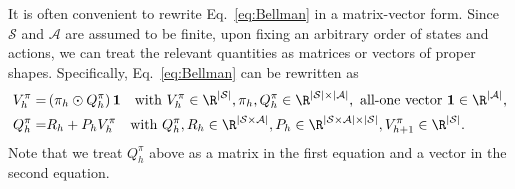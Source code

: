 It is often convenient to rewrite Eq.~\eqref{eq:Bellman} in a matrix-vector form.
Since $\mathcal{S}$ and $\mathcal{A}$ are assumed to be finite, upon fixing an arbitrary order of states and actions, we can treat the relevant quantities as matrices or vectors of proper shapes.
Specifically, Eq.~\eqref{eq:Bellman} can be rewritten as
\begin{align*}
    V_h^\pi =&\left(\pi_h \odot Q_h^\pi\right)\mathbf{1}
    \quad \text{with }V_h^\pi\in\R^{|\mathcal{S}|}, \pi_h ,Q_h^\pi \in \R^{|\mathcal{S}| \times |\mathcal{A}|}, \text{ all-one vector } \mathbf{1} \in\R^{|\mathcal{A}|}, 
    \\
    Q_h^\pi =& R_h + P_h V^\pi_h \quad \text{with }
    Q_h^\pi, R_h \in \R^{|\mathcal{S} \times \mathcal{A}|},
    P_h\in\R^{|\mathcal{S} \times \mathcal{A}|\times|\mathcal{S}|}, V_{h+1}^\pi\in\R^{|\mathcal{S}|}
    .
\end{align*}
Note that we treat $Q_h^\pi$ above as a matrix in the first equation and a vector in the second equation.

